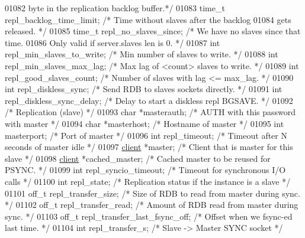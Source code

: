 \begin{DoxyCode}
{{{{{{{01082 \textcolor{comment}{                                       byte in the replication backlog buffer.*/}
01083     time\_t repl\_backlog\_time\_limit; \textcolor{comment}{/* Time without slaves after the backlog}
01084 \textcolor{comment}{                                       gets released. */}
01085     time\_t repl\_no\_slaves\_since;    \textcolor{comment}{/* We have no slaves since that time.}
01086 \textcolor{comment}{                                       Only valid if server.slaves len is 0. */}
01087     \textcolor{keywordtype}{int} repl\_min\_slaves\_to\_write;   \textcolor{comment}{/* Min number of slaves to write. */}
01088     \textcolor{keywordtype}{int} repl\_min\_slaves\_max\_lag;    \textcolor{comment}{/* Max lag of <count> slaves to write. */}
01089     \textcolor{keywordtype}{int} repl\_good\_slaves\_count;     \textcolor{comment}{/* Number of slaves with lag <= max\_lag. */}
01090     \textcolor{keywordtype}{int} repl\_diskless\_sync;         \textcolor{comment}{/* Send RDB to slaves sockets directly. */}
01091     \textcolor{keywordtype}{int} repl\_diskless\_sync\_delay;   \textcolor{comment}{/* Delay to start a diskless repl BGSAVE. */}
01092     \textcolor{comment}{/* Replication (slave) */}
01093     \textcolor{keywordtype}{char} *masterauth;               \textcolor{comment}{/* AUTH with this password with master */}
01094     \textcolor{keywordtype}{char} *masterhost;               \textcolor{comment}{/* Hostname of master */}
01095     \textcolor{keywordtype}{int} masterport;                 \textcolor{comment}{/* Port of master */}
01096     \textcolor{keywordtype}{int} repl\_timeout;               \textcolor{comment}{/* Timeout after N seconds of master idle */}
01097     \hyperlink{structclient}{client} *master;     \textcolor{comment}{/* Client that is master for this slave */}
01098     \hyperlink{structclient}{client} *cached\_master; \textcolor{comment}{/* Cached master to be reused for PSYNC. */}
01099     \textcolor{keywordtype}{int} repl\_syncio\_timeout; \textcolor{comment}{/* Timeout for synchronous I/O calls */}
01100     \textcolor{keywordtype}{int} repl\_state;          \textcolor{comment}{/* Replication status if the instance is a slave */}
01101     off\_t repl\_transfer\_size; \textcolor{comment}{/* Size of RDB to read from master during sync. */}
01102     off\_t repl\_transfer\_read; \textcolor{comment}{/* Amount of RDB read from master during sync. */}
01103     off\_t repl\_transfer\_last\_fsync\_off; \textcolor{comment}{/* Offset when we fsync-ed last time. */}
01104     \textcolor{keywordtype}{int} repl\_transfer\_s;     \textcolor{comment}{/* Slave -> Master SYNC socket */}
}}}}}}}
\end{DoxyCode}
